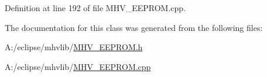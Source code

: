 \-Definition at line 192 of file \-M\-H\-V\-\_\-\-E\-E\-P\-R\-O\-M.\-cpp.



\-The documentation for this class was generated from the following files\-:\begin{DoxyCompactItemize}
\item 
\-A\-:/eclipse/mhvlib/\hyperlink{_m_h_v___e_e_p_r_o_m_8h}{\-M\-H\-V\-\_\-\-E\-E\-P\-R\-O\-M.\-h}\item 
\-A\-:/eclipse/mhvlib/\hyperlink{_m_h_v___e_e_p_r_o_m_8cpp}{\-M\-H\-V\-\_\-\-E\-E\-P\-R\-O\-M.\-cpp}\end{DoxyCompactItemize}
